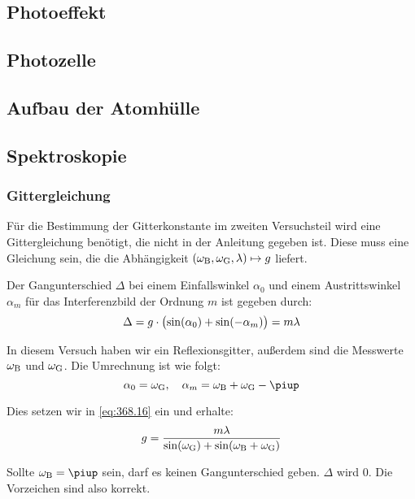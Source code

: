 \subsection{Photoeffekt}

\subsection{Photozelle}

\subsection{Aufbau der Atomhülle}

\subsection{Spektroskopie}

\subsubsection{Gittergleichung}

Für die Bestimmung der Gitterkonstante im zweiten Versuchsteil wird eine
Gittergleichung benötigt, die nicht in der Anleitung gegeben ist. Diese muss
eine Gleichung sein, die die Abhängigkeit $(\omega_\text B, \omega_\text G,
\lambda) \mapsto g$ liefert.

Der Gangunterschied $\Delta$ bei einem Einfallswinkel $\alpha_0$ und einem
Austrittswinkel $\alpha_m$ für das Interferenzbild der Ordnung $m$ ist gegeben
durch: \cite[Formel~368.16]{physik312-Anleitung}
\begin{equation}
    \label{eq:368.16}
    \Delta = g \cdot \del{\sin(\alpha_0) + \sin(-\alpha_m)} = m \lambda
\end{equation}

In diesem Versuch haben wir ein Reflexionsgitter, außerdem sind die Messwerte
$\omega_\text B$ und $\omega_\text G$. Die Umrechnung ist wie folgt:
\[
    \alpha_0 = \omega_\text G
    \eqnsep
    \alpha_m = \omega_\text B + \omega_\text G - \piup
\]

Dies setzen wir in \eqref{eq:368.16} ein und erhalte:
\begin{equation}
    \label{eq:gittergleichung}
    g = \frac{m \lambda}{\sin(\omega_\text G) + \sin(\omega_\text B + \omega_\text G)}
\end{equation}

Sollte $\omega_\text B = \piup$ sein, darf es keinen Gangunterschied geben.
$\Delta$ wird 0. Die Vorzeichen sind also korrekt.

